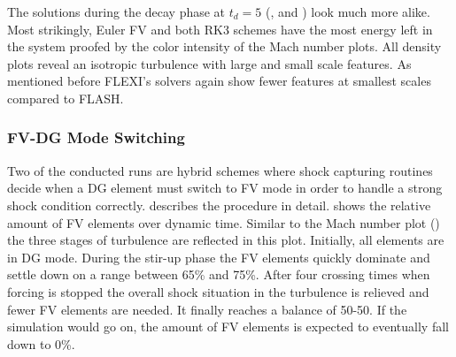 The solutions during the decay phase at $t_d = 5$
(,
 and
)
look much more alike. Most strikingly, Euler FV and both RK3 schemes have the
most energy left in the system proofed by the color intensity of the Mach
number plots. All density plots reveal an isotropic turbulence with large and
small scale features. As mentioned before FLEXI's solvers again show fewer features
at smallest scales compared to FLASH.







\subsubsection{FV-DG Mode Switching}
\label{sec:stirturb-mode-switching}
Two of the conducted runs are hybrid schemes where shock capturing routines
decide when a DG element must switch to FV mode in order to handle a strong
shock condition correctly.  describes the procedure in
detail.  shows the relative
amount of FV elements over dynamic time. Similar to the Mach number plot
() the three stages of turbulence
are reflected in this plot. Initially, all elements are in DG mode.  During the
stir-up phase the FV elements quickly dominate and settle down on a range
between 65\% and 75\%. After four crossing times when forcing is
stopped the overall shock situation in the turbulence is relieved and fewer FV
elements are needed. It finally reaches a balance of 50-50.  If the simulation
would go on, the amount of FV elements is expected to eventually fall down to 0\%.

